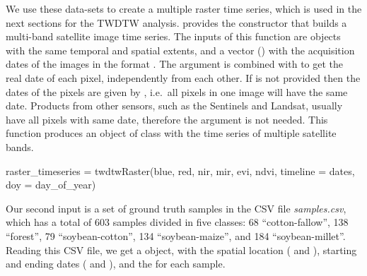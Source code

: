 \documentclass[article,shortnames]{jss}
\begin{document}
We use these data-sets to create a multiple raster time series, which is
used in the next sections for the TWDTW analysis.  provides
the constructor  that builds a multi-band satellite
image time series. The inputs of this function are 
objects with the same temporal and spatial extents, and a vector
() with the acquisition dates of the images in the format
. The argument  is combined with
 to get the real date of each pixel, independently from
each other. If  is not provided then the dates of the pixels
are given by , i.e.~all pixels in one image will have the
same date. Products from other sensors, such as the Sentinels and
Landsat, usually have all pixels with same date, therefore the argument
 is not needed. This function produces an object of class
 with the time series of multiple satellite bands.

\begin{CodeChunk}
\begin{CodeInput}
raster_timeseries = twdtwRaster(blue, red, nir, mir, evi, ndvi, 
  timeline = dates, doy = day_of_year)
\end{CodeInput}
\end{CodeChunk}

Our second input is a set of ground truth samples in the CSV file
\emph{samples.csv}, which has a total of 603 samples divided in five
classes: 68 ``cotton-fallow'', 138 ``forest'', 79 ``soybean-cotton'',
134 ``soybean-maize'', and 184 ``soybean-millet''. Reading this CSV
file, we get a  object, with the spatial location
( and ), starting and ending dates
( and ), and the  for each sample.
\end{document}
